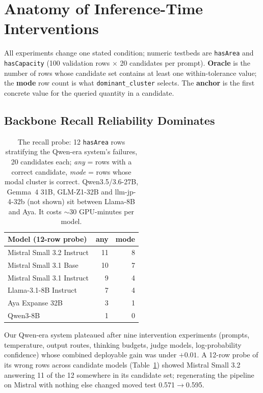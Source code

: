 \documentclass[11pt]{article}
\begin{document}
\section{Anatomy of Inference-Time Interventions}
\label{sec:anatomy}

All experiments change one stated condition; numeric testbeds are
\texttt{hasArea} and \texttt{hasCapacity} (100 validation rows $\times$
20 candidates per prompt). \textbf{Oracle} is the number of rows whose
candidate set contains at least one within-tolerance value; the
\textbf{mode} row count is what \texttt{dominant\_cluster} selects. The
\textbf{anchor} is the first concrete value for the queried quantity in a
candidate.

\subsection{Backbone Recall Reliability Dominates}
\label{sec:screening}

\begin{table}[t]
\centering
\footnotesize
\setlength{\tabcolsep}{4pt}
\begin{tabular}{lrr}
\toprule
Model (12-row probe) & any & mode \\
\midrule
Mistral Small 3.2 Instruct & 11 & 8 \\
Mistral Small 3.1 Base & 10 & 7 \\
Mistral Small 3.1 Instruct & 9 & 4 \\
Llama-3.1-8B Instruct & 7 & 4 \\
Aya Expanse 32B & 3 & 1 \\
Qwen3-8B & 1 & 0 \\
\bottomrule
\end{tabular}
\caption{The recall probe: 12 \texttt{hasArea} rows stratifying the
Qwen-era system's failures, 20 candidates each; \emph{any} = rows with a
correct candidate, \emph{mode} = rows whose modal cluster is correct.
Qwen3.5/3.6-27B, Gemma~4 31B, GLM-Z1-32B and llm-jp-4-32b (not shown) sit
between Llama-8B and Aya. It costs $\sim$30 GPU-minutes per model.}
\label{tab:probe}
\end{table}

Our Qwen-era system plateaued after nine intervention experiments
(prompts, temperature, output routes, thinking budgets, judge models,
log-probability confidence) whose combined deployable gain was under
$+0.01$. A 12-row probe of its wrong rows across candidate models
(Table~\ref{tab:probe}) showed Mistral Small 3.2 answering 11 of the 12
somewhere in its candidate set; regenerating the pipeline on Mistral with
nothing else changed moved test 0.571$\rightarrow$0.595.
\end{document}
